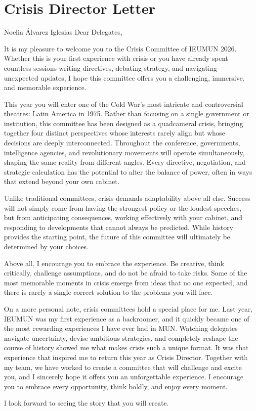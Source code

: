 \section{Crisis Director Letter}

\begin{chairletter}{Noelia Álvarez Iglesias}
Dear Delegates,

It is my pleasure to welcome you to the Crisis Committee of IEUMUN 2026. Whether this is your first experience with crisis or you have already spent countless sessions writing directives, debating strategy, and navigating unexpected updates, I hope this committee offers you a challenging, immersive, and memorable experience.

This year you will enter one of the Cold War’s most intricate and controversial theatres: Latin America in 1975. Rather than focusing on a single government or institution, this committee has been designed as a quadcameral crisis, bringing together four distinct perspectives whose interests rarely align but whose decisions are deeply interconnected. Throughout the conference, governments, intelligence agencies, and revolutionary movements will operate simultaneously, shaping the same reality from different angles. Every directive, negotiation, and strategic calculation has the potential to alter the balance of power, often in ways that extend beyond your own cabinet.

Unlike traditional committees, crisis demands adaptability above all else. Success will not simply come from having the strongest policy or the loudest speeches, but from anticipating consequences, working effectively with your cabinet, and responding to developments that cannot always be predicted. While history provides the starting point, the future of this committee will ultimately be determined by your choices.

Above all, I encourage you to embrace the experience. Be creative, think critically, challenge assumptions, and do not be afraid to take risks. Some of the most memorable moments in crisis emerge from ideas that no one expected, and there is rarely a single correct solution to the problems you will face.

On a more personal note, crisis committees hold a special place for me. Last year, IEUMUN was my first experience as a backroomer, and it quickly became one of the most rewarding experiences I have ever had in MUN. Watching delegates navigate uncertainty, devise ambitious strategies, and completely reshape the course of history showed me what makes crisis such a unique format. It was that experience that inspired me to return this year as Crisis Director. Together with my team, we have worked to create a committee that will challenge and excite you, and I sincerely hope it offers you an unforgettable experience. I encourage you to embrace every opportunity, think boldly, and enjoy every moment.

I look forward to seeing the story that you will create.

\end{chairletter}
